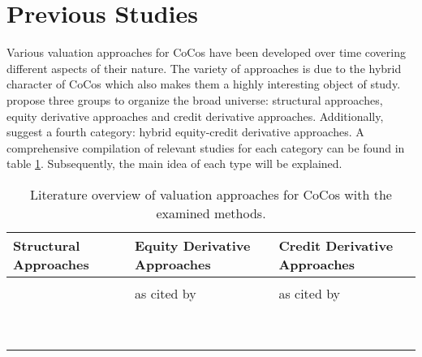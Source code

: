 \section{Previous Studies}
Various valuation approaches for CoCos have been developed over time covering different aspects of their nature. The variety of approaches is due to the hybrid character of CoCos which also makes them a highly interesting object of study. \citet{wilkens2014contingent} propose three groups to organize the broad universe: structural approaches, equity derivative approaches and credit derivative approaches. Additionally, \citet{turfus2015cocos} suggest a fourth category: hybrid equity-credit derivative approaches. A comprehensive compilation of relevant studies for each category can be found in table \ref{tbl:paper}. Subsequently, the main idea of each type will be explained.
\begin{table}[H]
	\tiny
	\setlength{\extrarowheight}{2.5pt}
	\centering
	\begin{tabular}{>{\centering\arraybackslash}p{4cm}>{\centering\arraybackslash}p{4cm}>{\centering\arraybackslash}p{4cm}}
		\toprule
			\textbf{Structural Approaches} & \textbf{Equity Derivative Approaches} & \textbf{Credit Derivative Approaches} \\
		\midrule
			\cellcolor{blue!20} \citet{pennacchi2010structural} &\cellcolor{blue!20} \citet{de2011pricing} & \cellcolor{blue!20} \citet{de2011pricing}\\
			\citet{albul2010contingent}  & \citet{henriques2011making} as cited by \citet{erismann2015pricing} &  \citet{serjantov2011hybrid} as cited by \citet{wilkens2014contingent}\\
			\citet{madan2011conic}  & \citet{alvemar2012modelling} &  \citet{alvemar2012modelling}\\
			\citet{glasserman2012contingent} & \citet{corcuera2013pricing} & \citet{erismann2015pricing}   \\
			\citet{alvemar2012modelling}  & \citet{corcuera2014close}  &  \\
			\citet{buergi2013pricing} & \citet{teneberg2012equity} &  \\
			\citet{hilscher2014bank}  & \citet{erismann2015pricing} &  \\
			\citet{pennacchi2015reexamination} & & \\
			\cmidrule[0.12em](lr){2-3}
			\citet{cheridito2015pricing} & \multicolumn{2}{c}{\textbf{Hybrid Equity-Credit Derivative Approaches}}  \\
			\cmidrule[0.075em](lr){2-3}
			\citet{erismann2015pricing} & \multicolumn{2}{c}{\citet{turfus2015cocos}} \\
			\citet{sundaresan2015design} & & \\
		\bottomrule
	\end{tabular}
	\caption[Literature overview of valuation approaches for CoCos] {Literature overview of valuation approaches for CoCos \citep{wilkens2014contingent, erismann2015pricing} with the examined methods.}
	\label{tbl:paper}
\end{table}
